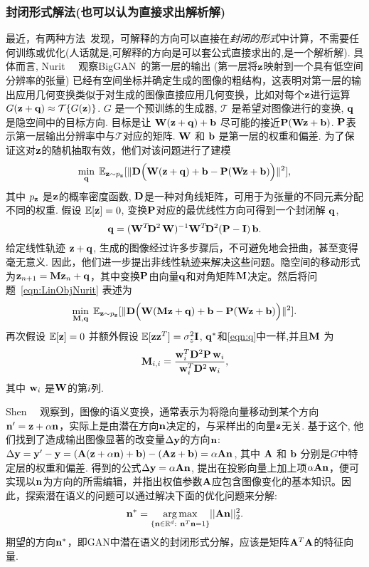 \subsubsection{封闭形式解法(也可以认为直接求出解析解)}
\label{sec:closed}
最近，有两种方法~\cite{nurit2020steerability,shen2020closedform}发现，可解释的方向可以直接在\textit{封闭的形式}中计算，不需要任何训练或优化(人话就是,可解释的方向是可以套公式直接求出的,是一个解析解).
具体而言, Nurit~\etal~\cite{nurit2020steerability} 观察BigGAN~\cite{brock2018large}的第一层的输出  (第一层将$\mathbf{z}$映射到一个具有低空间分辨率的张量) 已经有空间坐标并确定生成的图像的粗结构，这表明对第一层的输出应用几何变换类似于对生成的图像直接应用几何变换，比如对每个$\mathbf{z}$进行运算 $G(\mathbf{z}+\mathbf{q})\approx \mathcal{T}\{G(\mathbf{z})\}$. 
$G$ 是一个预训练的生成器, $\mathcal{T}$ 是希望对图像进行的变换, $\mathbf{q}$ 是隐空间中的目标方向.
目标是让 $\mathbf{W}(\mathbf{z}+\mathbf{q})+\mathbf{b}$ 尽可能的接近$\mathbf{P}(\mathbf{W}\mathbf{z}+\mathbf{b})$.
$\mathbf{P}$表示第一层输出分辨率中与$\mathcal{T}$对应的矩阵. 
$\mathbf{W}$ 和 $\mathbf{b}$ 是第一层的权重和偏差.
为了保证这对$\mathbf{z}$的随机抽取有效，他们对该问题进行了建模
\begin{equation}
\min_{\q}\;
\E_{\z \sim p_{\z}}
[\|\D\Big(\W(\z+\q)+\bb-\PP(\W\z+\bb)\Big)\|^2],
\label{eqn:LinObjNurit}
\end{equation}
其中 $p_{\mathbf{z}}$ 是$\mathbf{z}$的概率密度函数, $\mathbf{D}$是一种对角线矩阵，可用于为张量的不同元素分配不同的权重. 
假设 $\mathbb{E}[\mathbf{z}]=0$, 变换$\mathbf{P}$对应的最优线性方向可得到一个封闭解 $\mathbf{q}$,
\begin{equation}
\q = (\W^T\!\D^2\,\W)^{-1}\W^T\!\D^2(\PP-\I)\,\bb.
\label{eqn:q}
\end{equation}
给定线性轨迹 $\mathbf{z}+\mathbf{q}$, 生成的图像经过许多步骤后，不可避免地会扭曲，甚至变得毫无意义.
因此，他们进一步提出非线性轨迹来解决这些问题。隐空间的移动形式为$\mathbf{z}_{n+1}=\mathbf{M}\mathbf{z}_{n}+\mathbf{q}$，其中变换$\mathbf{P}$由向量$\mathbf{q}$和对角矩阵$\mathbf{M}$决定。然后将问题~\eqref{eqn:LinObjNurit} 表述为
\begin{equation}
\min_{\M,\q}\;\E_{\z \sim p_{\z}}[\|\D\Big(\W(\M\z+\q)+\bb-\PP(\W\z+\bb)\Big)\|^2].
\label{eq:LinNonObjNurit}
\end{equation}
再次假设 $\mathbb{E}[\mathbf{z}]=0$ 并额外假设 $\mathbb{E}[\mathbf{z}\mathbf{z}^T]=\sigma^2_z \mathbf{I}$,  $\mathbf{q}^*$和\eqref{eqn:q}中一样,并且$\mathbf{M}$ 为
\begin{equation}
\M_{i,i} = \frac{\w_i^T\D^2\PP\,\w_i}{\w_i^T\D^2\,\w_i},
\label{eqn:M}
\end{equation}
其中 $\mathbf{w}_i$ 是$\mathbf{W}$的第$i$列.

Shen~\etal~\cite{shen2020closedform} 观察到，图像的语义变换，通常表示为将隐向量移动到某个方向$\mathbf{n}^{\prime} = \mathbf{z} + \alpha \mathbf{n}$，实际上是由潜在方向$\mathbf{n}$决定的，与采样出的向量$\mathbf{z}$无关.
基于这个, 他们找到了造成输出图像显著的改变量$\Delta\mathbf{y}$的方向$\mathbf{n}$: $\Delta\mathbf{y} =\mathbf{y}^{\prime}-\mathbf{y}= (\mathbf{A}(\mathbf{z} + \alpha\mathbf{n}) + \mathbf{b}) - (\mathbf{A}\mathbf{z} + \mathbf{b}) = \alpha\mathbf{A}\mathbf{n}$, 其中 $\mathbf{A}$ 和 $\mathbf{b}$ 分别是$G$中特定层的权重和偏差. 
得到的公式$\Delta\mathbf{y} = \alpha\mathbf{A}\mathbf{n}$, 提出在投影向量上加上项$\alpha\mathbf{A}\mathbf{n}$，便可实现以$\mathbf{n}$为方向的所需编辑，并指出权值参数$\mathbf{A}$应包含图像变化的基本知识。因此，探索潜在语义的问题可以通过解决下面的优化问题来分解:
\begin{equation}
  \n^* = \underset{\{\n\in\R^d:\ \n^T\n = 1\}}{\arg\max} ||\A\n||_2^2.  
  \label{eq:single-optimization}    
\end{equation}
期望的方向$\mathbf{n}^*$，即GAN中潜在语义的封闭形式分解，应该是矩阵$\mathbf{A}^T\mathbf{A}$的特征向量.

